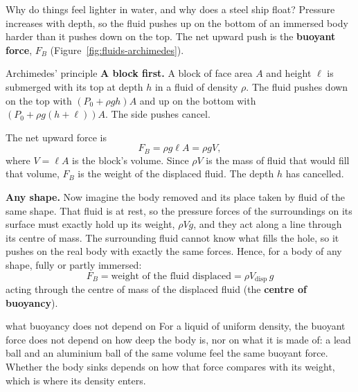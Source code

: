 Why do things feel lighter in water, and why does a steel ship float? Pressure increases with depth, so the
fluid pushes up on the bottom of an immersed body harder than it pushes down on the top. The net upward
push is the \textbf{buoyant force}, $F_B$ (Figure~\ref{fig:fluids-archimedes}).

\begin{figure}[htbp]
\centering
{}
\end{figure}

\begin{derivbox}{Archimedes' principle}
 \textbf{A block first.} A block of face area $A$ and height $\ell$ is submerged with its top at depth
$h$ in a fluid of density $\rho$. The fluid pushes down on the top with $(P_0+\rho gh)A$ and up on the
bottom with $(P_0+\rho g(h+\ell))A$. The side pushes cancel.

 The net upward force is
\[
F_B=\rho g\ell A=\rho gV,
\]
where $V=\ell A$ is the block's volume. Since $\rho V$ is the mass of fluid that would fill that volume,
$F_B$ is the weight of the displaced fluid. The depth $h$ has cancelled.

 \textbf{Any shape.} Now imagine the body removed and its place taken by fluid of the same shape.
That fluid is at rest, so the pressure forces of the surroundings on its surface must exactly hold up its
weight, $\rho Vg$, and they act along a line through its centre of mass. The surrounding fluid cannot know
what fills the hole, so it pushes on the real body with exactly the same forces. Hence, for a body of any
shape, fully or partly immersed:
\[
\boxed{\;F_B=\text{weight of the fluid displaced}=\rho V_{\text{disp}}\,g\;}
\]
acting through the centre of mass of the displaced fluid (the \textbf{centre of buoyancy}).
\end{derivbox}

\begin{trapbox}{what buoyancy does not depend on}
For a liquid of uniform density, the buoyant force does not depend on how deep the body is, nor on what it
is made of: a lead ball and an aluminium ball of the same volume feel the same buoyant force. Whether the
body sinks depends on how that force compares with its weight, which is where its density enters.
\end{trapbox}

